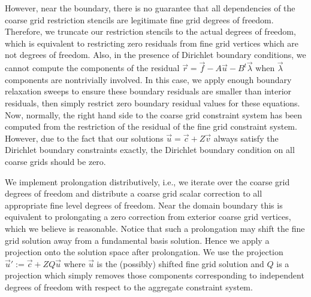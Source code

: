 However, near the boundary, there is no guarantee that all dependencies of the coarse grid restriction stencils are legitimate fine grid degrees of freedom. Therefore, we truncate our restriction stencils to the actual degrees of freedom, which is equivalent to restricting zero residuals from fine grid vertices which are not degrees of freedom. Also, in the presence of Dirichlet boundary conditions, we cannot compute the components of the residual $\vec{r} = \vec{f} - A \vec{u} - B^t \vec{\lambda}$ when $\vec{\lambda}$ components are nontrivially involved. In this case, we apply enough boundary relaxation sweeps to ensure these boundary residuals are smaller than interior residuals, then simply restrict zero boundary residual values for these equations. Now, normally, the right hand side to the coarse grid constraint system has been computed from the restriction of the residual of the fine grid constraint system. However, due to the fact that our solutions $\vec{u} = \vec{c} + Z \vec{v}$ always satisfy the Dirichlet boundary constraints exactly, the Dirichlet boundary condition on all coarse grids should be zero.

We implement prolongation distributively, i.e., we iterate over the coarse grid degrees of freedom and distribute a coarse grid scalar correction to all appropriate fine level degrees of freedom. Near the domain boundary this is equivalent to prolongating a zero correction from exterior coarse grid vertices, which we believe is reasonable. Notice that such a prolongation may shift the fine grid solution away from a fundamental basis solution. Hence we apply a projection onto the solution space after prolongation. We use the projection $\vec{u}' := \vec{c} + Z Q \vec{u}$ where $\vec{u}$ is the (possibly) shifted fine grid solution and $Q$ is a projection which simply removes those components corresponding to independent degrees of freedom with respect to the aggregate constraint system.

